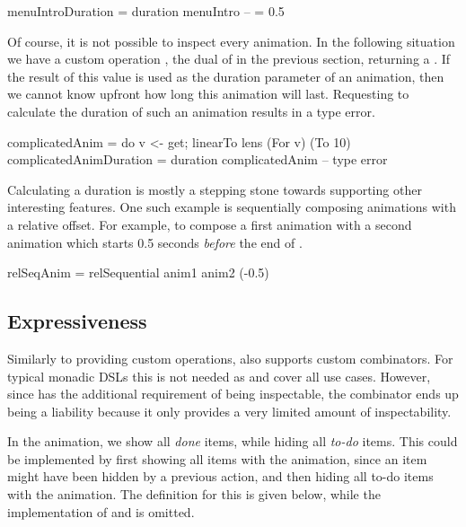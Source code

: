 \begin{spec}
menuIntroDuration = duration menuIntro -- = 0.5
\end{spec}

Of course, it is not possible to inspect every animation. In the following situation we have a custom operation , the dual of  in the previous section, returning a . If the result of this value is used as the duration parameter of an animation, then we cannot know upfront how long this animation will last. Requesting to calculate the duration of such an animation results in a type error.

\begin{spec}
complicatedAnim = do v <- get; linearTo lens (For v) (To 10)
complicatedAnimDuration = duration complicatedAnim -- type error
\end{spec}

Calculating a duration is mostly a stepping stone towards supporting other interesting features. One such example is sequentially composing animations with a relative offset. For example, to compose a first animation  with a second animation  which starts 0.5 seconds \emph{before} the end of .

\begin{spec}
relSeqAnim = relSequential anim1 anim2 (-0.5)
\end{spec}

\subsection{Expressiveness}
\label{sec:customcomb}

Similarly to providing custom operations, \dsl{} also supports custom
combinators. For typical monadic DSLs this is not needed as \hs{>>=} and  
cover all use cases.
However, since \dsl{} has the additional requirement of being inspectable, the
\hs{>>=} combinator ends up being a liability because it only provides a very
limited amount of inspectability.

In the  animation, we show all \emph{done} items, while
hiding all \emph{to-do} items. This could be implemented by first
showing all items with the  animation, since an item might have
been hidden by a previous action, and then hiding all to-do items with the
 animation. The definition for this is given below, while the
implementation of  and  is omitted.

